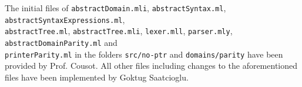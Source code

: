 \documentclass [10pt]{article}
\begin{document}
The initial files of \verb|abstractDomain.mli|, \verb|abstractSyntax.ml|, \verb|abstractSyntaxExpressions.ml|, \\\verb|abstractTree.ml|, \verb|abstractTree.mli|, \verb|lexer.mll|, \verb|parser.mly|, \verb|abstractDomainParity.ml| and \\\verb|printerParity.ml| in the folders \verb|src/no-ptr| and \verb|domains/parity| have been provided by Prof. Cousot. All other files including changes to the aforementioned files have been implemented by Goktug Saatcioglu.
\end{document}

